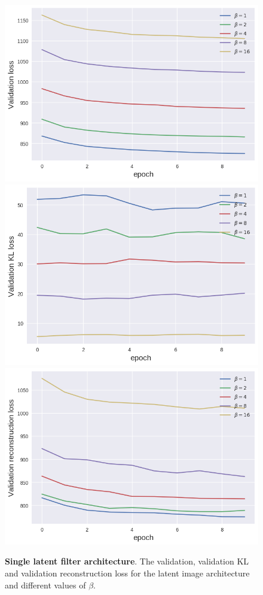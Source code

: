 \begin{figure}[h!]
\centering
\captionsetup{justification=centering}
    \includegraphics[scale=0.5]{figures/results/latent_image/val_loss.png}
    \includegraphics[scale=0.5]{figures/results/latent_image/val_kl_loss.png}
    \includegraphics[scale=0.5]{figures/results/latent_image/val_reconstruction_loss.png}
\caption{\textbf{Single latent filter architecture}. The validation, validation KL and validation reconstruction loss for the latent image architecture and different values of $\beta$.}
\label{fig:latent_image_graphs}
\end{figure}



